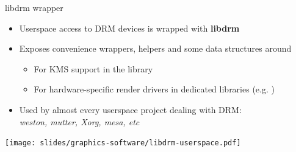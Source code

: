 \begin{frame}{libdrm wrapper}
  \begin{itemize}
  \item Userspace access to DRM devices is wrapped with \textbf{libdrm}
  \item Exposes convenience wrappers, helpers and some data structures around 
    \begin{itemize}
    \item For KMS support in the  library
    \item For hardware-specific render drivers in dedicated libraries (e.g. )
    \end{itemize}
  \item Used by almost every userspace project dealing with DRM:\\
    \textit{weston, mutter, Xorg, mesa, etc}
  \end{itemize}

  \begin{center}
  \texttt{[image: slides/graphics-software/libdrm-userspace.pdf]}
  \end{center}
\end{frame}

